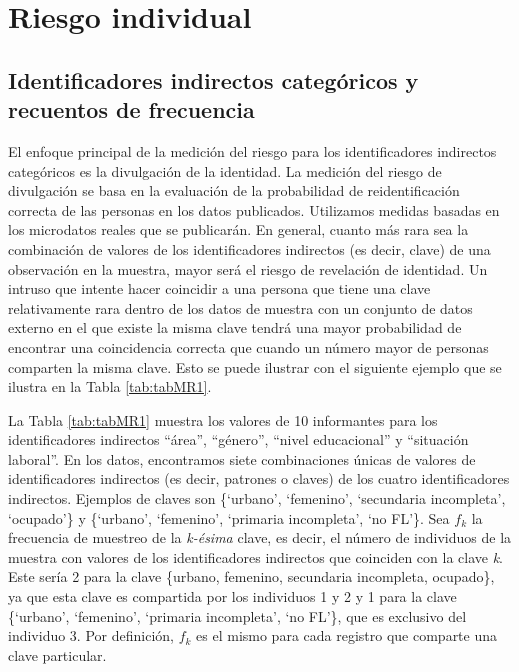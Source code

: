 \documentclass[]{book}
\theoremstyle{definition}
\theoremstyle{definition}
\theoremstyle{definition}
\theoremstyle{definition}
\theoremstyle{remark}
\begin{document}
\hypertarget{riesgo-individual}{%
\section{Riesgo individual}\label{riesgo-individual}}

\hypertarget{identificadores-indirectos-categuxf3ricos-y-recuentos-de-frecuencia}{%
\subsection{Identificadores indirectos categóricos y recuentos de frecuencia}\label{identificadores-indirectos-categuxf3ricos-y-recuentos-de-frecuencia}}

El enfoque principal de la medición del riesgo para los identificadores indirectos categóricos es la divulgación de la identidad. La medición del riesgo de divulgación se basa en la evaluación de la probabilidad de reidentificación correcta de las personas en los datos publicados. Utilizamos medidas basadas en los microdatos reales que se publicarán. En general, cuanto más rara sea la combinación de valores de los identificadores indirectos (es decir, clave) de una observación en la muestra, mayor será el riesgo de revelación de identidad. Un intruso que intente hacer coincidir a una persona que tiene una clave relativamente rara dentro de los datos de muestra con un conjunto de datos externo en el que existe la misma clave tendrá una mayor probabilidad de encontrar una coincidencia correcta que cuando un número mayor de personas comparten la misma clave. Esto se puede ilustrar con el siguiente ejemplo que se ilustra en la Tabla \ref{tab:tabMR1}.

La Tabla \ref{tab:tabMR1} muestra los valores de 10 informantes para los identificadores indirectos ``área'', ``género'', ``nivel educacional'' y ``situación laboral''. En los datos, encontramos siete combinaciones únicas de valores de identificadores indirectos (es decir, patrones o claves) de los cuatro identificadores indirectos. Ejemplos de claves son \{`urbano', `femenino', `secundaria incompleta', `ocupado'\} y \{`urbano', `femenino', `primaria incompleta', `no FL'\}. Sea \(f_{k}\) la frecuencia de muestreo de la \emph{k-ésima} clave, es decir, el número de individuos de la muestra con valores de los identificadores indirectos que coinciden con la clave \emph{k}. Este sería 2 para la clave \{urbano, femenino, secundaria incompleta, ocupado\}, ya que esta clave es compartida por los individuos 1 y 2 y 1 para la clave \{`urbano', `femenino', `primaria incompleta', `no FL'\}, que es exclusivo del individuo 3. Por definición, \(f_{k}\) es el mismo para cada registro que comparte una clave particular.
\end{document}
